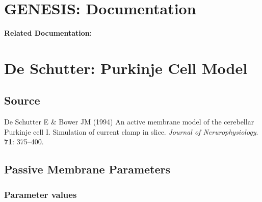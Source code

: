\documentclass[12pt]{article}
\begin{document}
\section*{GENESIS: Documentation}

{\bf Related Documentation:}

\section*{De Schutter: Purkinje Cell Model}

\subsection*{Source}

De Schutter E \& Bower JM (1994) An active membrane model of the cerebellar Purkinje cell I. Simulation of current clamp in slice. {\it Journal of Nerurophysiology}. {\bf 71}: 375--400.

\subsection*{Passive Membrane Parameters}

\subsubsection*{Parameter values}
\end{document}
